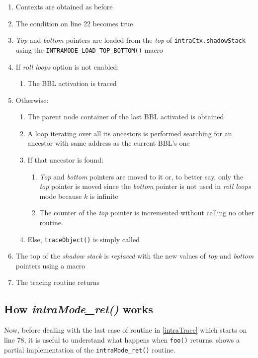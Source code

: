 \documentclass[a4paper,10pt]{report}
\begin{document}
\begin{enumerate}
\item Contexts are obtained as before
\item The condition on line 22 becomes true
\item \emph{Top} and \emph{bottom} pointers are loaded from the \emph{top}
of \verb|intraCtx.shadowStack| using the \verb|INTRAMODE_LOAD_TOP_BOTTOM()| macro
\item If \emph{roll loops} option is not enabled:
\begin{enumerate}
\item The BBL activation is traced
\end{enumerate}
\item Otherwise:
\begin{enumerate}
\item The parent node container of the last BBL activated is obtained
\item A loop iterating over all its ancestors is performed
searching for an ancestor with same address as the current BBL's one
\item If that ancestor is found:
\begin{enumerate}
\item \emph{Top} and \emph{bottom}
pointers are moved to it or, to better say, only the \emph{top} pointer
is moved since the \emph{bottom} pointer is not used in \emph{roll loops} mode
because $k$ is infinite
\item The counter of the \emph{top} pointer
is incremented without calling no other routine.
\end{enumerate}
\item Else, \verb|traceObject()| is simply called
\end{enumerate}
\item The top of the \emph{shadow stack} is \emph{replaced} with the new values
of \emph{top} and \emph{bottom} pointers using a macro
\item The tracing routine returns
\end{enumerate}

\subsection{How \emph{intraMode\_ret()} works}

Now, before dealing with the last case of routine in \cref{intraTrace}
which starts on line 78, it is useful to understand
what happens when \verb|foo()| returns.  shows
a partial implementation of the \verb|intraMode_ret()| routine.
\end{document}
